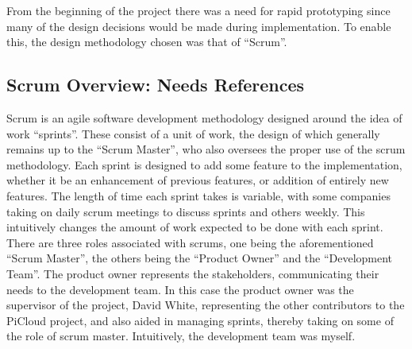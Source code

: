From the beginning of the project there was a need for rapid prototyping since many of the design decisions would be made during implementation.
To enable this, the design methodology chosen was that of ``Scrum''.

\subsection{Scrum Overview: Needs References}
Scrum is an agile software development methodology designed around the idea of work ``sprints''.
These consist of a unit of work, the design of which generally remains up to the ``Scrum Master'', who also oversees the proper use of the scrum methodology.
Each sprint is designed to add some feature to the implementation, whether it be an enhancement of previous features, or addition of entirely new features.
The length of time each sprint takes is variable, with some companies taking on daily scrum meetings to discuss sprints and others weekly.
This intuitively changes the amount of work expected to be done with each sprint.
There are three roles associated with scrums, one being the aforementioned ``Scrum Master'', the others being the ``Product Owner'' and the ``Development Team''.
The product owner represents the stakeholders, communicating their needs to the development team.
In this case the product owner was the supervisor of the project, David White, representing the other contributors to the PiCloud project, and also aided in managing sprints, thereby taking on some of the role of scrum master.
Intuitively, the development team was myself.
